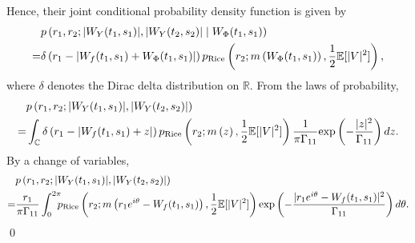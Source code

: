 \documentclass{amsart}
\begin{document}
Hence, their joint conditional probability density function is given by
\begin{align}\notag
&p\left(r_{1},r_{2}; |W_{Y}(t_{1},s_{1})|,|W_{Y}(t_{2},s_{2})|\mid W_{\Phi}(t_{1},s_{1})\right)
\\\notag=&\delta\left(r_{1}-\left|W_{f}(t_{1},s_{1})+W_{\Phi}(t_{1},s_{1})\right|\right)
 p_{\textup{Rice}}\left(r_{2};m\left(W_{\Phi}(t_{1},s_{1})\right),
\frac{1}{2}\mathbb{E}[|V|^{2}]\right),
\end{align}
where $\delta$ denotes the Dirac delta distribution on $\mathbb{R}$.
From the laws of probability,
\begin{align}\notag
&p\left(r_{1},r_{2}; |W_{Y}(t_{1},s_{1})|,|W_{Y}(t_{2},s_{2})|\right)
\\\notag=&\int_{\mathbb{C}}\delta\left(r_{1}-\left|W_{f}(t_{1},s_{1})+z\right|\right)
 p_{\textup{Rice}}\left(r_{2};m\left(z\right),
\frac{1}{2}\mathbb{E}[|V|^{2}]\right)
 \frac{1}{\pi\Gamma_{11}}
\textup{exp}\left(-\frac{|z|^{2}}{\Gamma_{11}}\right)dz.
\end{align}
By a change of variables,
\begin{align}\notag
&p\left(r_{1},r_{2}; |W_{Y}(t_{1},s_{1})|,|W_{Y}(t_{2},s_{2})|\right)
\\\notag=&\frac{r_{1}}{\pi\Gamma_{11}}\int_{0}^{2\pi}
 \hspace{-0.2cm}p_{\textup{Rice}}\left(r_{2};m\left(r_{1}e^{i\theta}-W_{f}(t_{1},s_{1})\right),
\frac{1}{2}\mathbb{E}[|V|^{2}]\right)
\textup{exp}\left(-\frac{|r_{1}e^{i\theta}-W_{f}(t_{1},s_{1})|^{2}}{\Gamma_{11}}\right)d\theta.
\end{align}
\qed
\end{document}
